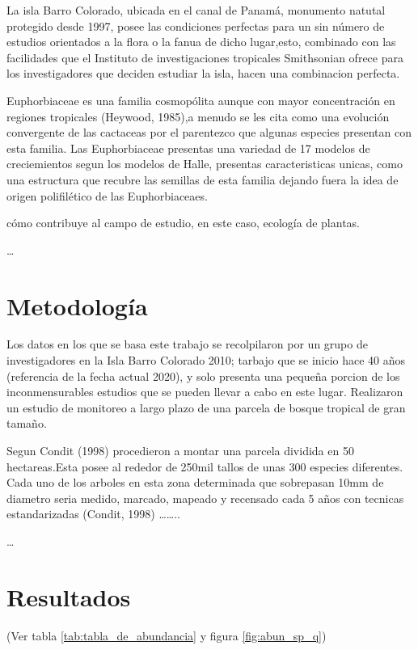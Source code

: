 \documentclass[11pt,]{article}
\begin{document}
La isla Barro Colorado, ubicada en el canal de Panamá, monumento natutal
protegido desde 1997, posee las condiciones perfectas para un sin número
de estudios orientados a la flora o la fanua de dicho lugar,esto,
combinado con las facilidades que el Instituto de investigaciones
tropicales Smithsonian ofrece para los investigadores que deciden
estudiar la isla, hacen una combinacion perfecta.

Euphorbiaceae es una familia cosmopólita aunque con mayor concentración
en regiones tropicales (Heywood, 1985),a menudo se les cita como una
evolución convergente de las cactaceas por el parentezco que algunas
especies presentan con esta familia. Las Euphorbiaceae presentas una
variedad de 17 modelos de creciemientos segun los modelos de Halle,
presentas caracteristicas unicas, como una estructura que recubre las
semillas de esta familia dejando fuera la idea de origen polifilético de
las Euphorbiaceaes.

cómo contribuye al campo de estudio, en este caso, ecología de plantas.

\ldots

\section{Metodología}\label{metodologuxeda}

Los datos en los que se basa este trabajo se recolpilaron por un grupo
de investigadores en la Isla Barro Colorado 2010; tarbajo que se inicio
hace 40 años (referencia de la fecha actual 2020), y solo presenta una
pequeña porcion de los inconmensurables estudios que se pueden llevar a
cabo en este lugar. Realizaron un estudio de monitoreo a largo plazo de
una parcela de bosque tropical de gran tamaño.

Segun Condit (1998) procedieron a montar una parcela dividida en 50
hectareas.Esta posee al rededor de 250mil tallos de unas 300 especies
diferentes. Cada uno de los arboles en esta zona determinada que
sobrepasan 10mm de diametro seria medido, marcado, mapeado y recensado
cada 5 años con tecnicas estandarizadas (Condit, 1998)
\ldots{}\ldots{}..

\ldots

\section{Resultados}\label{resultados}

(Ver tabla \ref{tab:tabla_de_abundancia} y figura \ref{fig:abun_sp_q})
\end{document}
